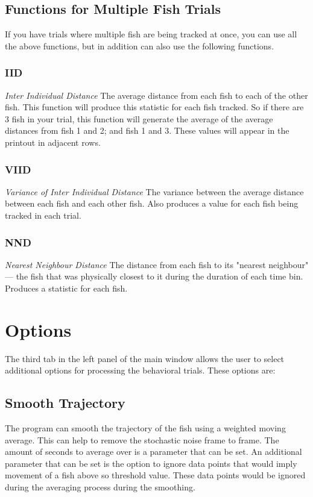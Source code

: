 \documentclass[12pt,titlepage]{report}
\begin{document}
\section{Functions for Multiple Fish Trials}
If you have trials where multiple fish are being tracked at once, you can use all the above functions, but in addition can also use the following functions.
\subsection{IID}
\emph{Inter Individual Distance} The average distance from each fish to each of the other fish. This function will produce this statistic for each fish tracked. So if there are 3 fish in your trial, this function will generate the average of the average distances from fish 1 and 2; and fish 1 and 3. These values will appear in the printout in adjacent rows.
\subsection{VIID}
\emph{Variance of Inter Individual Distance} The variance between the average distance between each fish and each other fish. Also produces a value for each fish being tracked in each trial.
\subsection{NND}
\emph{Nearest Neighbour Distance} The distance from each fish to its "nearest neighbour" --- the fish that was physically closest to it during the duration of each time bin. Produces a statistic for each fish.
\ 
\chapter{Options}
The third tab in the left panel of the main window allows the user to select additional options for processing the behavioral trials. These options are:
\section{Smooth Trajectory}
The program can smooth the trajectory of the fish using a weighted moving average. This can help to remove the stochastic noise frame to frame. The amount of seconds to average over is a parameter that can be set. An additional parameter that can be set is the option to ignore data points that would imply movement of a fish above so threshold value. These data points would be ignored during the averaging process during the smoothing.
\end{document}
